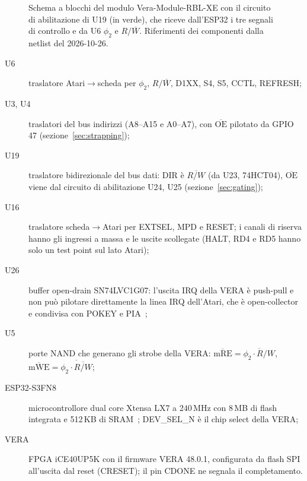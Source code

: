 \documentclass[11pt,a4paper,twoside,openright]{report}
\newcommand{\MHz}{\,\mathrm{MHz}}
\newcommand{\sig}[1]{\textsf{#1}}
\begin{document}
\begin{figure}[htbp]
  \caption[Schema a blocchi del modulo]{Schema a blocchi del modulo Vera-Module-RBL-XE
  con il circuito di abilitazione di U19 (in verde), che riceve dall'ESP32 i tre segnali di
  controllo e da U6 $\phi_2$ e $R/\overline{W}$. Riferimenti dei componenti dalla
  netlist del 2026-10-26.}
  \label{fig:blocchi}
\end{figure}

\begin{description}
  \item[U6] traslatore Atari$\to$scheda per $\phi_2$, $R/\overline{W}$, \sig{D1XX},
        \sig{S4}, \sig{S5}, \sig{CCTL}, \sig{REFRESH};
  \item[U3, U4] traslatori del bus indirizzi (A8--A15 e A0--A7), con $\overline{\text{OE}}$
        pilotato da GPIO 47 (sezione~\ref{sec:strapping});
  \item[U19] traslatore bidirezionale del bus dati: \sig{DIR} è $\overline{R/W}$ (da U23,
        74HCT04), $\overline{\text{OE}}$ viene dal circuito di abilitazione U24, U25
        (sezione~\ref{sec:gating});
  \item[U16] traslatore scheda$\to$Atari per \sig{EXTSEL}, \sig{MPD} e \sig{RESET}; i canali
        di riserva hanno gli ingressi a massa e le uscite scollegate (\sig{HALT}, \sig{RD4} e
        \sig{RD5} hanno solo un test point sul lato Atari);
  \item[U26] buffer open-drain SN74LVC1G07: l'uscita IRQ della VERA è push-pull e non può
        pilotare direttamente la linea IRQ dell'Atari, che è open-collector e condivisa con
        POKEY e PIA~\cite[§2.3]{hwreq};
  \item[U5] porte NAND che generano gli strobe della VERA:
        $\overline{\text{mRE}} = \overline{\phi_2 \cdot R/W}$,
        $\overline{\text{mWE}} = \overline{\phi_2 \cdot \overline{R/W}}$;
  \item[ESP32-S3FN8] microcontrollore dual core Xtensa LX7 a $240\MHz$ con 8\,MB di flash
        integrata e 512\,KB di SRAM~\cite{esp32s3ds}; \sig{DEV\_SEL\_N} è il chip select
        della VERA;
  \item[VERA] FPGA iCE40UP5K con il firmware VERA 48.0.1, configurata da flash SPI
        all'uscita dal reset (\sig{CRESET}); il pin \sig{CDONE} ne segnala il completamento.
\end{description}
\end{document}
